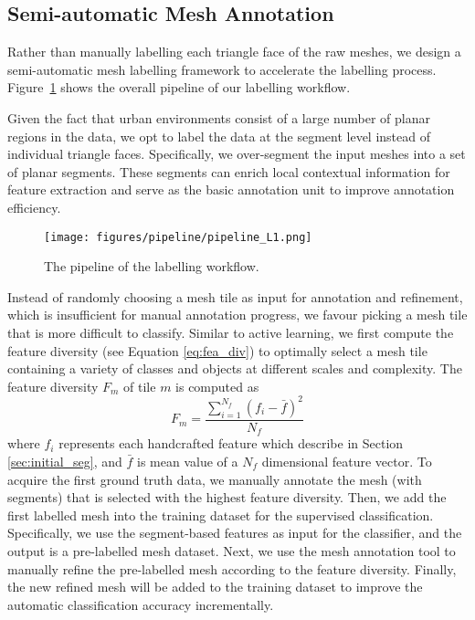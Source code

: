 \subsection{Semi-automatic Mesh Annotation}  \label{sec:mesh_annota}
Rather than manually labelling each triangle face of the raw meshes, we design a semi-automatic mesh labelling framework to accelerate the labelling process. Figure~\ref{fig:pipeline} shows the overall pipeline of our labelling workflow.

Given the fact that urban environments consist of a large number of planar regions in the data, we opt to label the data at the segment level instead of individual triangle faces. 
Specifically, we over-segment the input meshes into a set of planar segments. 
These segments can enrich local contextual information for feature extraction and serve as the basic annotation unit to improve annotation efficiency.

\begin{figure}[!tb]
	\centering
	\texttt{[image: figures/pipeline/pipeline\_L1.png]}
	\caption{The pipeline of the labelling workflow.}
	\label{fig:pipeline}
\end{figure}

Instead of randomly choosing a mesh tile as input for annotation and refinement, which is insufficient for manual annotation progress, we favour picking a mesh tile that is more difficult to classify.
Similar to active learning, we first compute the feature diversity (see Equation \ref{eq:fea_div}) to optimally select a mesh tile containing a variety of classes and objects at different scales and complexity.
The feature diversity $F_{m}$ of tile $m$ is computed as
\begin{equation}\label{eq:fea_div}
	F_{m}=\frac{\sum_{i=1}^{N_{f}}\left ( f_i - \bar{f} \right )^{2}}{N_{f}}
\end{equation}
where $f_i$ represents each handcrafted feature which describe in Section \ref{sec:initial_seg}, and $\bar{f}$ is mean value of a $N_{f}$ dimensional feature vector.
To acquire the first ground truth data, we manually annotate the mesh (with segments) that is selected with the highest feature diversity.
Then, we add the first labelled mesh into the training dataset for the supervised classification.
Specifically, we use the segment-based features as input for the classifier, and the output is a pre-labelled mesh dataset.
Next, we use the mesh annotation tool to manually refine the pre-labelled mesh according to the feature diversity.
Finally, the new refined mesh will be added to the training dataset to improve the automatic classification accuracy incrementally.


